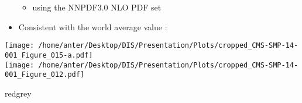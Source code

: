 \begin{frame}
\begin{minipage}[thbp]{0.7\textwidth}
\begin{itemize}
\vspace{1mm}
\begin{itemize}
\tri
\item {\footnotesize using the NNPDF3.0 NLO PDF set \\}
\end{itemize}
\vspace{-1mm}
\item {\footnotesize Consistent with the world average value : \\} \vspace{1mm}
\end{itemize}
\ball
\end{minipage}
\hspace*{-6mm}
\begin{minipage}[thbp]{0.08\textwidth}
\hspace*{0mm}\texttt{[image: /home/anter/Desktop/DIS/Presentation/Plots/cropped\_CMS-SMP-14-001\_Figure\_015-a.pdf]}\\
\hspace*{3mm}\texttt{[image: /home/anter/Desktop/DIS/Presentation/Plots/cropped\_CMS-SMP-14-001\_Figure\_012.pdf]}\\
\hspace*{12mm}\begin{beamercolorbox}[wd=23mm,ht=1mm,center,shadow=true, rounded=true]{redgrey}
{}
{\scalebox {0.61} {}}
\end{beamercolorbox}
\end{minipage}
\end{frame}

